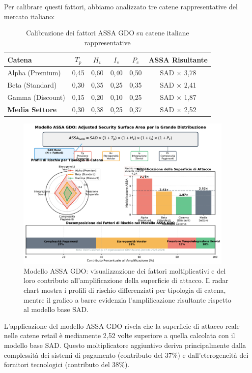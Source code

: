 Per calibrare questi fattori, abbiamo analizzato tre catene rappresentative del mercato italiano:

\begin{table}[htbp]
\centering
\caption{Calibrazione dei fattori ASSA GDO su catene italiane rappresentative}
\label{tab:assa_calibration}
\begin{tabular}{lccccc}
\toprule
\textbf{Catena} & \textbf{$T_p$} & \textbf{$H_v$} & \textbf{$I_s$} & \textbf{$P_c$} & \textbf{ASSA Risultante} \\
\midrule
Alpha (Premium) & 0,45 & 0,60 & 0,40 & 0,50 & SAD × 3,78 \\
Beta (Standard) & 0,30 & 0,35 & 0,25 & 0,35 & SAD × 2,41 \\
Gamma (Discount) & 0,15 & 0,20 & 0,10 & 0,25 & SAD × 1,87 \\
\midrule
\textbf{Media Settore} & 0,30 & 0,38 & 0,25 & 0,37 & SAD × 2,52 \\
\bottomrule
\end{tabular}
\end{table}

\begin{figure}[htbp]
\centering
\includegraphics[width=0.95\textwidth]{thesis_figures/cap2/fig_2_6_assa_gdo_model.pdf}
\caption{Modello ASSA GDO: visualizzazione dei fattori moltiplicativi e del loro contributo all'amplificazione della superficie di attacco. Il radar chart mostra i profili di rischio differenziati per tipologia di catena, mentre il grafico a barre evidenzia l'amplificazione risultante rispetto al modello base SAD.}
\label{fig:assa_gdo_model}
\end{figure}

L'applicazione del modello ASSA GDO rivela che la superficie di attacco reale nelle catene retail è mediamente 2,52 volte superiore a quella calcolata con il modello base SAD. Questo moltiplicatore aggiuntivo deriva principalmente dalla complessità dei sistemi di pagamento (contributo del 37\%) e dall'eterogeneità dei fornitori tecnologici (contributo del 38\%).

